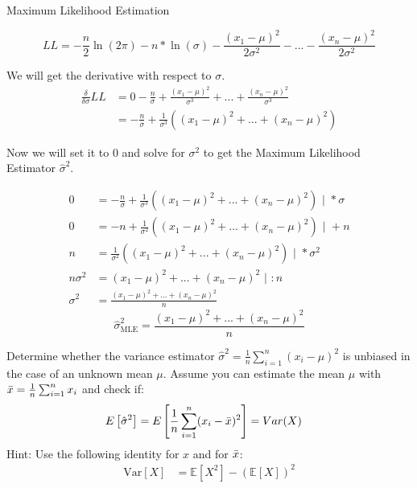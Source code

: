 \documentclass[
	english,
        solution=true
	]{tudaexercise}
\begin{document}
\begin{task}[points=20]{Maximum Likelihood Estimation}
\begin{subtask}[points=5]
\begin{solution}
\[LL=-\frac{n}{2} \ln(2\pi) - n * \ln(\sigma) - \frac{(x_1-\mu)^2}{2\sigma^2}-...- \frac{(x_n-\mu)^2}{2\sigma^2}\]

We will get the derivative with respect to $\sigma$.
\begin{align*}
    \frac{\delta}{\delta \sigma} LL &= 0-\frac{n}{\sigma}+\frac{(x_1-\mu)^2}{\sigma^3}+...+\frac{(x_n-\mu)^2}{\sigma^3} \\
    &= -\frac{n}{\sigma} + \frac{1}{\sigma^3}((x_1-\mu)^2+...+(x_n-\mu)^2)
\end{align*}

Now we will set it to $0$ and solve for $\sigma^2$ to get the Maximum Likelihood Estimator $\hat{\sigma}^2$.

\begin{align*}
    0 &= -\frac{n}{\sigma} + \frac{1}{\sigma^3}((x_1-\mu)^2+...+(x_n-\mu)^2) \text{  | } * \sigma \\
    0 &= -n+\frac{1}{\sigma^2}((x_1-\mu)^2+...+(x_n-\mu)^2) \text{  | } +n \\
    n &= \frac{1}{\sigma^2}((x_1-\mu)^2+...+(x_n-\mu)^2) \text{  | } *\sigma^2 \\
    n\sigma^2 &= (x_1-\mu)^2+...+(x_n-\mu)^2 \text{  | } :n \\
    \sigma^2 &= \frac{(x_1-\mu)^2+...+(x_n-\mu)^2}{n}
\end{align*}
\[\hat{\sigma}^2_{\text{MLE}}= \frac{(x_1-\mu)^2+...+(x_n-\mu)^2}{n}\]
\end{solution}
\end{subtask}

\begin{subtask}[points = 3]
Determine whether the variance estimator $\hat{\sigma}^{2}=\frac{1}{n}\sum_{i=1}^{n}(x_{i}  - \mu)^{2}$ is unbiased in the case of an unknown mean $\mu$. Assume you can estimate the mean $\mu$ with $\Bar{x} =  \frac{1}{n} \sum_{i=1}^{n} x_{i} $ and check if: 
\begin{align*}
E\left[\hat{\sigma}^{2}\right] &=E\left[ \frac{1}{n}\sum_{i=1}^{n} (x_{i}  - \Bar{x})^{2}\right]= Var(X)
\end{align*}
Hint: Use the following identity for $x$ and for $\Bar{x}$:
\begin{align*}
    \mathrm{Var}[X] &= \mathbb{E}[X^2] - \left(\mathbb{E}[X]\right)^2   
\end{align*}

\end{subtask}

\begin{solution}


\end{solution}
\end{task}
\end{document}
